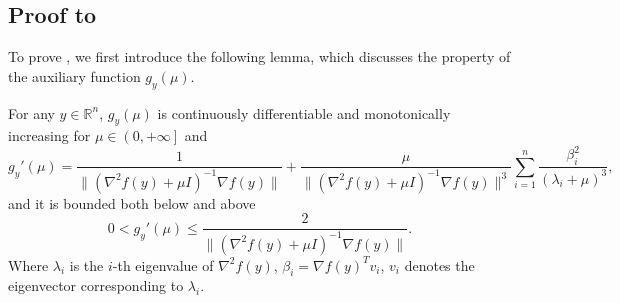 \documentclass{mcom-l}
\numberwithin{equation}{section}
\begin{document}
\subsection*{Proof to }
To prove , we first introduce the following lemma, which discusses the property of the auxiliary function $g_y(\mu)$.
\begin{lemma}
    \label{lem.property g}
    For any $y\in \mathbb{R}^n$, $g_y(\mu)$ is continuously differentiable and monotonically increasing for $\mu \in \left (0,+\infty\right ]$ and
    \begin{equation}
        \label{eq.derivative}
        g_y'(\mu) = \frac{1}{\|\left (\nabla ^2 f(y)+\mu I \right)^{-1}\nabla f(y)\|}+\frac{\mu}{\|\left (\nabla ^2 f(y)+\mu I \right)^{-1}\nabla f(y)\|^3}\sum_{i=1}^n\frac{\beta_i^2}{\left (\lambda_i+\mu\right )^3},
    \end{equation}
    and it is bounded both below and above
    \begin{equation}
        \label{eq.derivative bound}
        0< g_y'(\mu) \leq \frac{2}{\|\left (\nabla ^2 f(y)+\mu I \right)^{-1}\nabla f(y)\|}.
    \end{equation}
    Where $\lambda_i$ is the $i$-th eigenvalue of $\nabla ^2 f(y)$, $\beta_i = \nabla f(y)^T v_i$, $v_i$ denotes the eigenvector corresponding to $\lambda_i$.
\end{lemma}
\end{document}
